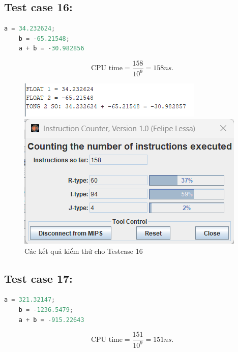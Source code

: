 \subsection{Test case 16:}
\begin{lstlisting}[language=Python]
    a = 34.232624;
    b = -65.21548;
    a + b = -30.982856
\end{lstlisting}
\[
\text{CPU time} = \frac{\text{158}}{10^9} = 158 ns.
\]
\begin{figure}[!h]
    \centering
    \begin{minipage}[b]{0.48\textwidth}
        \centering
        \includegraphics[width=\textwidth]{image/TESTCASE/Testcase 16.png}
    \end{minipage}
    \hfill
    \begin{minipage}[b]{0.48\textwidth}
        \centering
        \includegraphics[width=\textwidth]{image/TESTCASE/Instruction Counter 16.png}
    \end{minipage}
    \vspace{0.5cm}
    \caption{Các kết quả kiểm thử cho Testcase 16}
\end{figure}

\subsection{Test case 17:}
\begin{lstlisting}[language=Python]
    a = 321.32147;
    b = -1236.5479;
    a + b = -915.22643
\end{lstlisting}
\[
\text{CPU time} = \frac{\text{151}}{10^9} = 151 ns.
\]

